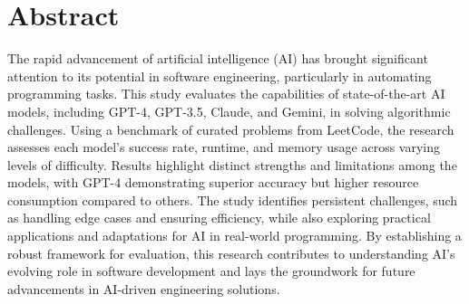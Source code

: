 
\section*{Abstract}

The rapid advancement of artificial intelligence (AI) has brought significant attention to its potential in software engineering, particularly in automating programming tasks. This study evaluates the capabilities of state-of-the-art AI models, including GPT-4, GPT-3.5, Claude, and Gemini, in solving algorithmic challenges. Using a benchmark of curated problems from LeetCode, the research assesses each model's success rate, runtime, and memory usage across varying levels of difficulty. Results highlight distinct strengths and limitations among the models, with GPT-4 demonstrating superior accuracy but higher resource consumption compared to others. The study identifies persistent challenges, such as handling edge cases and ensuring efficiency, while also exploring practical applications and adaptations for AI in real-world programming. By establishing a robust framework for evaluation, this research contributes to understanding AI's evolving role in software development and lays the groundwork for future advancements in AI-driven engineering solutions.

